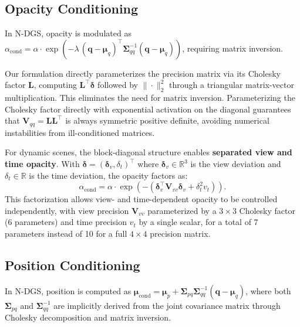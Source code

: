 \documentclass{article}
\theoremstyle{plain}
\theoremstyle{definition}
\theoremstyle{remark}
\begin{document}
\subsection{Opacity Conditioning}

In N-DGS, opacity is modulated as $\alpha_{\text{cond}} = \alpha \cdot \exp(-\lambda\,(\mathbf{q}-\boldsymbol{\mu}_q)^\top \boldsymbol{\Sigma}_{qq}^{-1}(\mathbf{q}-\boldsymbol{\mu}_q))$, requiring matrix inversion.

Our formulation directly parameterizes the precision matrix via its Cholesky factor $\mathbf{L}$, computing $\mathbf{L}^\top \boldsymbol{\delta}$ followed by $\|\cdot\|_2^2$ through a triangular matrix-vector multiplication. This eliminates the need for matrix inversion. Parameterizing the Cholesky factor directly with exponential activation on the diagonal guarantees that $\mathbf{V}_{qq} = \mathbf{L}\mathbf{L}^\top$ is always symmetric positive definite, avoiding numerical instabilities from ill-conditioned matrices.

For dynamic scenes, the block-diagonal structure enables \textbf{separated view and time opacity}. With $\boldsymbol{\delta} = (\boldsymbol{\delta}_v, \delta_t)^\top$ where $\boldsymbol{\delta}_v \in \mathbb{R}^3$ is the view deviation and $\delta_t \in \mathbb{R}$ is the time deviation, the opacity factors as:
\begin{equation}
\alpha_{\text{cond}} = \alpha \cdot \exp\left(-\left(\boldsymbol{\delta}_v^\top \mathbf{V}_{vv} \boldsymbol{\delta}_v + \delta_t^2 v_t\right)\right).
\end{equation}
This factorization allows view- and time-dependent opacity to be controlled independently, with view precision $\mathbf{V}_{vv}$ parameterized by a $3 \times 3$ Cholesky factor (6 parameters) and time precision $v_t$ by a single scalar, for a total of 7 parameters instead of 10 for a full $4 \times 4$ precision matrix.

\subsection{Position Conditioning}
\label{subsec:position}

In N-DGS, position is computed as $\boldsymbol{\mu}_{\text{cond}} = \boldsymbol{\mu}_p + \boldsymbol{\Sigma}_{pq}\boldsymbol{\Sigma}_{qq}^{-1}(\mathbf{q}-\boldsymbol{\mu}_q)$, where both $\boldsymbol{\Sigma}_{pq}$ and $\boldsymbol{\Sigma}_{qq}^{-1}$ are implicitly derived from the joint covariance matrix through Cholesky decomposition and matrix inversion.
\end{document}
